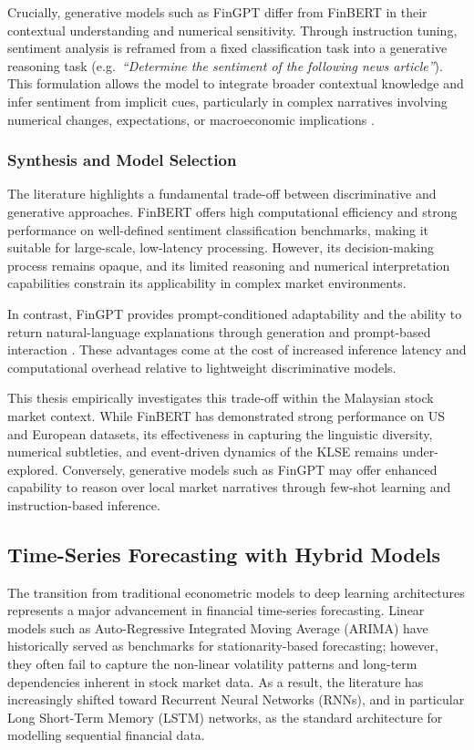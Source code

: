\documentclass[12pt]{ucetd}
\begin{document}
Crucially, generative models such as FinGPT differ from FinBERT in their contextual understanding and numerical sensitivity. Through instruction tuning, sentiment analysis is reframed from a fixed classification task into a generative reasoning task (e.g.\ \emph{``Determine the sentiment of the following news article''}). This formulation allows the model to integrate broader contextual knowledge and infer sentiment from implicit cues, particularly in complex narratives involving numerical changes, expectations, or macroeconomic implications \cite{yang2023fingpt}.

\subsubsection{Synthesis and Model Selection}

The literature highlights a fundamental trade-off between discriminative and generative approaches. FinBERT offers high computational efficiency and strong performance on well-defined sentiment classification benchmarks, making it suitable for large-scale, low-latency processing. However, its decision-making process remains opaque, and its limited reasoning and numerical interpretation capabilities constrain its applicability in complex market environments.

In contrast, FinGPT provides prompt-conditioned adaptability and the ability to return natural-language explanations through generation and prompt-based interaction \cite{yang2023fingpt}. These advantages come at the cost of increased inference latency and computational overhead relative to lightweight discriminative models.

This thesis empirically investigates this trade-off within the Malaysian stock market context. While FinBERT has demonstrated strong performance on US and European datasets, its effectiveness in capturing the linguistic diversity, numerical subtleties, and event-driven dynamics of the KLSE remains under-explored. Conversely, generative models such as FinGPT may offer enhanced capability to reason over local market narratives through few-shot learning and instruction-based inference.



\subsection{Time-Series Forecasting with Hybrid Models}

The transition from traditional econometric models to deep learning architectures represents a major advancement in financial time-series forecasting. Linear models such as Auto-Regressive Integrated Moving Average (ARIMA) have historically served as benchmarks for stationarity-based forecasting; however, they often fail to capture the non-linear volatility patterns and long-term dependencies inherent in stock market data. As a result, the literature has increasingly shifted toward Recurrent Neural Networks (RNNs), and in particular Long Short-Term Memory (LSTM) networks, as the standard architecture for modelling sequential financial data.
\end{document}
